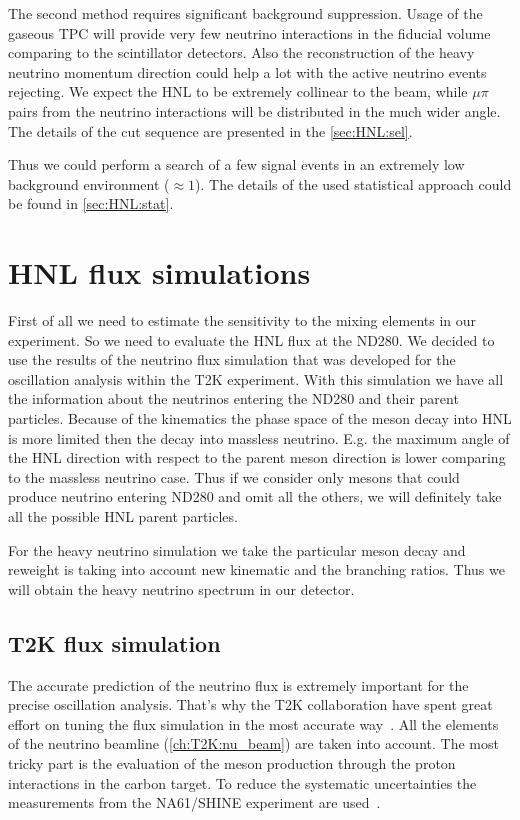 \documentclass[../main.tex]{subfiles}
\begin{document}
The second method requires significant background suppression. Usage of the gaseous TPC will provide very few neutrino interactions in the fiducial volume comparing to the scintillator detectors. Also the reconstruction of the heavy neutrino momentum direction could help a lot with the active neutrino events rejecting. We expect the HNL to be extremely collinear to the beam, while $\mu\pi$ pairs from the neutrino interactions will be distributed in the much wider angle. The details of the cut sequence are presented in the \autoref{sec:HNL:sel}.

Thus we could perform a search of a few signal events in an extremely low background environment ($\approx1$). The details of the used statistical approach could be found in \autoref{sec:HNL:stat}.

\chapter{HNL flux simulations}
\label{ch:HNL:HNLsim}

First of all we need to estimate the sensitivity to the mixing elements in our experiment. So we need to evaluate the HNL flux at the ND280. We decided to use the results of the neutrino flux simulation that was developed for the oscillation analysis within the T2K experiment. With this simulation we have all the information about the neutrinos entering the ND280 and their parent particles. Because of the kinematics the phase space of the meson decay into HNL is more limited then the decay into massless neutrino. E.g. the maximum angle of the HNL direction with respect to the parent meson direction is lower comparing to the massless neutrino case. Thus if we consider only mesons that could produce neutrino entering ND280 and omit all the others, we will definitely take all the possible HNL parent particles.

For the heavy neutrino simulation we take the particular meson decay and reweight is taking into account new kinematic and the branching ratios. Thus we will obtain the heavy neutrino spectrum in our detector.

\section{T2K flux simulation}
The accurate prediction of the neutrino flux is extremely important for the precise oscillation analysis. That's why the T2K collaboration have spent great effort on tuning the flux simulation in the most accurate way~\cite{Abe2013}. All the elements of the neutrino beamline (\autoref{ch:T2K:nu_beam}) are taken into account. The most tricky part is the evaluation of the meson production through the proton interactions in the carbon target. To reduce the systematic uncertainties the measurements from the NA61/SHINE experiment are used~\cite{Collaboration2018na61}.
\end{document}

